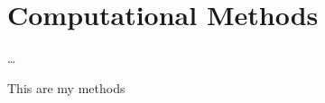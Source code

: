 \chapter{Computational Methods}\label{ch:methods}

\ldots

This are my methods

\instructionsappendices


\cleardoublepage

